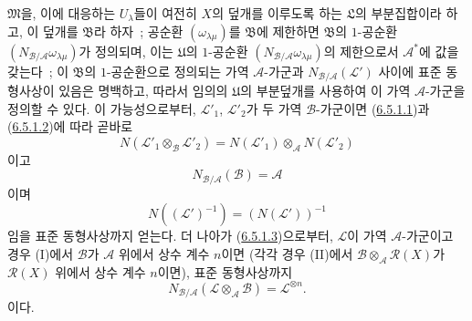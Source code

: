 \begin{env}[6.5.2]
$\mathfrak{M}$을, 이에 대응하는 $U_\lambda$들이 여전히 $X$의 덮개를
이루도록 하는 $\mathfrak{L}$의 부분집합이라 하고, 이 덮개를
$\mathfrak{B}$라 하자~; 공순환 $(\omega_{\lambda\mu})$를
$\mathfrak{B}$에 제한하면 $\mathfrak{B}$의 $1$-공순환
$(N_{\mathcal{B}/\mathcal{A}}\omega_{\lambda\mu})$가 정의되며, 이는
$\mathfrak{U}$의 $1$-공순환
$(N_{\mathcal{B}/\mathcal{A}}\omega_{\lambda\mu})$의 제한으로서
$\mathcal{A}^*$에 값을 갖는다~; 이 $\mathfrak{B}$의 $1$-공순환으로
정의되는 가역 $\mathcal{A}$-가군과
$N_{\mathcal{B}/\mathcal{A}}(\mathcal{L}')$ 사이에 표준 동형사상이
있음은 명백하고, 따라서 임의의 $\mathfrak{U}$의 부분덮개를 사용하여 이
가역 $\mathcal{A}$-가군을 정의할 수 있다. 이 가능성으로부터,
$\mathcal{L}'_1$, $\mathcal{L}'_2$가 두 가역 $\mathcal{B}$-가군이면
(\hyperref[II.6.5.1.1-ko]{6.5.1.1})과
(\hyperref[II.6.5.1.2-ko]{6.5.1.2})에 따라 곧바로
\[
\label{II.6.5.2.1-ko}
N(\mathcal{L}'_1\otimes_{\mathcal{B}}\mathcal{L}'_2)
=N(\mathcal{L}'_1)\otimes_{\mathcal{A}}N(\mathcal{L}'_2)
\tag{6.5.2.1}
\]
이고
\[
\label{II.6.5.2.2-ko}
N_{\mathcal{B}/\mathcal{A}}(\mathcal{B})=\mathcal{A}
\tag{6.5.2.2}
\]
이며
\[
\label{II.6.5.2.3-ko}
N((\mathcal{L}')^{-1})=(N(\mathcal{L}'))^{-1}
\tag{6.5.2.3}
\]
임을 표준 동형사상까지 얻는다. 더 나아가
(\hyperref[II.6.5.1.3-ko]{6.5.1.3})으로부터, $\mathcal{L}$이 가역
$\mathcal{A}$-가군이고 경우 (I)에서 $\mathcal{B}$가
$\mathcal{A}$ 위에서 상수 계수 $n$이면 (각각 경우 (II)에서
$\mathcal{B}\otimes_{\mathcal{A}}\mathcal{R}(X)$가
$\mathcal{R}(X)$ 위에서 상수 계수 $n$이면), 표준 동형사상까지
\[
\label{II.6.5.2.4-ko}
N_{\mathcal{B}/\mathcal{A}}(\mathcal{L}\otimes_{\mathcal{A}}\mathcal{B})
=\mathcal{L}^{\otimes n}.
\tag{6.5.2.4}
\]
이다.
\end{env}

